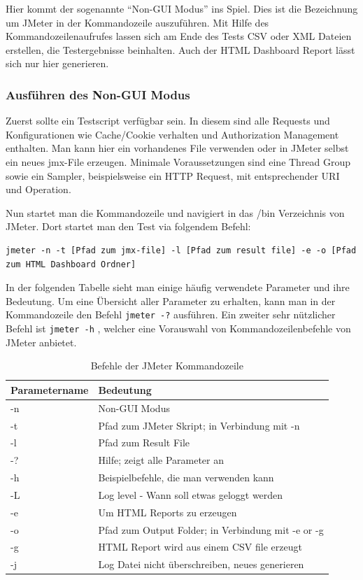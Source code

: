 \documentclass[a4paper,12pt]{article}
\newcommand{\codeInLine}[1]{%
\colorbox{graybackgroundColor}{\lstinline{#1}} %
}
\begin{document}
Hier kommt der sogenannte "`Non-GUI Modus"' ins Spiel. Dies ist die Bezeichnung um JMeter in der Kommandozeile auszuführen. Mit Hilfe des Kommandozeilenaufrufes lassen sich am Ende des Tests CSV oder XML Dateien erstellen, die Testergebnisse beinhalten. Auch der HTML Dashboard Report lässt sich nur hier generieren.

\subsubsection{Ausführen des Non-GUI Modus}
Zuerst sollte ein Testscript verfügbar sein. In diesem sind alle Requests und Konfigurationen wie Cache/Cookie verhalten und Authorization Management enthalten. Man kann hier ein vorhandenes File verwenden oder in JMeter selbst ein neues jmx-File erzeugen. Minimale Voraussetzungen sind eine Thread Group sowie ein Sampler, beispielsweise ein HTTP Request, mit entsprechender URI und Operation.

Nun startet man die Kommandozeile und navigiert in das /bin Verzeichnis von JMeter. Dort startet man den Test via folgendem Befehl:
\begin{lstlisting}
jmeter -n -t [Pfad zum jmx-file] -l [Pfad zum result file] -e -o [Pfad zum HTML Dashboard Ordner]
\end{lstlisting} 
In der folgenden Tabelle sieht man einige häufig verwendete Parameter und ihre Bedeutung. Um eine Übersicht aller Parameter zu erhalten, kann man in der Kommandozeile den Befehl \codeInLine{jmeter -?} ausführen. Ein zweiter sehr nützlicher Befehl ist \codeInLine{jmeter -h}, welcher eine Vorauswahl von Kommandozeilenbefehle von JMeter anbietet.
\begin{table}[H]
	\centering
	\begin{tabular}{|l|l|}
		\hline
		\textbf{Parametername} & \textbf{Bedeutung} \\
		\hline
		-n & Non-GUI Modus \\
		-t & Pfad zum JMeter Skript; in Verbindung mit -n \\
		-l & Pfad zum Result File \\
		-? & Hilfe; zeigt alle Parameter an \\
		-h & Beispielbefehle, die man verwenden kann \\
		-L & Log level - Wann soll etwas geloggt werden \\
		-e & Um HTML Reports zu erzeugen\\
		-o & Pfad zum Output Folder; in Verbindung mit -e or -g \\
		-g & HTML Report wird aus einem CSV file erzeugt \\ 
		-j & Log Datei nicht überschreiben, neues generieren \\
		\hline
	\end{tabular}
	\caption[tab_parameter_non_gui]{Befehle der JMeter Kommandozeile}
	\label{tab_parameter_non_gui}
\end{table}
\end{document}
